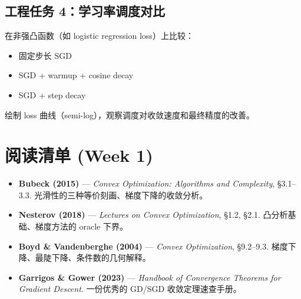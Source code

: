 \documentclass[12pt,a4paper]{ctexart}
\theoremstyle{definition}
\theoremstyle{plain}
\begin{document}
\subsection*{工程任务 4：学习率调度对比}

在非强凸函数（如 logistic regression loss）上比较：
\begin{itemize}
  \item 固定步长 SGD
  \item SGD + warmup + cosine decay
  \item SGD + step decay
\end{itemize}
绘制 loss 曲线（semi-log），观察调度对收敛速度和最终精度的改善。

\section{阅读清单 (Week 1)}

\begin{itemize}
  \item \textbf{Bubeck (2015)} — \textit{Convex Optimization: Algorithms and Complexity}, \S 3.1--3.3.
    光滑性的三种等价刻画、梯度下降的收敛分析。
  \item \textbf{Nesterov (2018)} — \textit{Lectures on Convex Optimization}, \S 1.2, \S 2.1.
    凸分析基础、梯度方法的 oracle 下界。
  \item \textbf{Boyd \& Vandenberghe (2004)} — \textit{Convex Optimization}, \S 9.2--9.3.
    梯度下降、最陡下降、条件数的几何解释。
  \item \textbf{Garrigos \& Gower (2023)} — \textit{Handbook of Convergence Theorems for Gradient Descent}.
    一份优秀的 GD/SGD 收敛定理速查手册。
\end{itemize}
\end{document}
